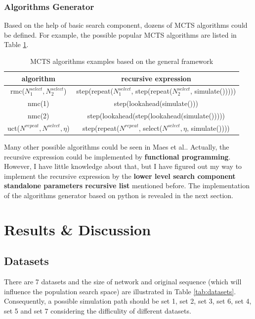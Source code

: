 \documentclass{article}
\begin{document}
\subsubsection{Algorithms Generator}
Based on the help of basic search component, dozens of MCTS algorithms could be defined. For example, the possible popular MCTS algorithms are listed in Table \ref{tab:algo_examples}.
\begin{table}[htbp]
  \centering
  \caption{MCTS algorithms examples based on the general framework}
    \begin{tabular}{cc}
    \toprule
    algorithm & recursive expression\\
    \midrule
    rmc($N_{1}^{select}, N_{2}^{select}$) & step(repeat($N_{1}^{select}$, step(repeat($N_{2}^{select}$, simulate()))))\\
    nmc(1) & step(lookahead(simulate())) \\
    nmc(2) & step(lookahead(step(lookahead(simulate())))) \\
    uct($N^{repeat}, N^{select}, \eta$) & step(repeat($N^{repeat}$, select($N^{select}, \eta$, simulate())))\\
    \bottomrule
    \end{tabular}%
  \label{tab:algo_examples}%
\end{table}%
Many other possible algorithms could be seen in Maes et al.\cite{maes2012monte}. Actually, the recursive expression could be implemented by \textbf{functional programming}. However, I have little knowledge about that, but I have figured out my way to implement the recursive expression by the \textbf{lower level search component standalone parameters recursive list} mentioned before. The implementation of the algorithms generator based on python is revealed in the next section.

\section{Results \& Discussion}

\subsection{Datasets}
There are 7 datasets and the size of network and original sequence (which will influence the population search space) are illustrated in Table \ref{tab:datasets}. Consequently, a possible simulation path should be set 1, set 2, set 3, set 6, set 4, set 5 and set 7 considering the difficulity of different datasets.
\end{document}
